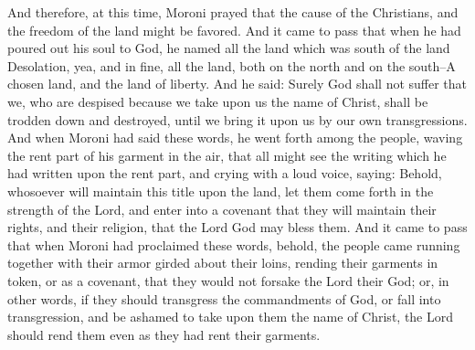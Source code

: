 And therefore, at this time, Moroni prayed that the cause of the Christians, and the freedom of the land might be favored.
\bverse \iffalse And it came to pass that when he had poured out his soul to God, he named all the land which was south of the land Desolation, yea, and in fine, all the land, both on the north and on the south--A chosen land, and the land of liberty. \fi
And it came to pass that when he had poured out his soul to God, he named all the land which was south of the land Desolation, yea, and in fine, all the land, both on the north and on the south--A chosen land, and the land of liberty.
\bverse \iffalse And he said: Surely God shall not suffer that we, who are despised because we take upon us the name of Christ, shall be trodden down and destroyed, until we bring it upon us by our own transgressions. \fi
And he said: Surely God shall not suffer that we, who are despised because we take upon us the name of Christ, shall be trodden down and destroyed, until we bring it upon us by our own transgressions.
\bverse \iffalse And when Moroni had said these words, he went forth among the people, waving the rent part of his garment in the air, that all might see the writing which he had written upon the rent part, and crying with a loud voice, saying: \fi
And when Moroni had said these words, he went forth among the people, waving the rent part of his garment in the air, that all might see the writing which he had written upon the rent part, and crying with a loud voice, saying:
\bverse \iffalse Behold, whosoever will maintain this title upon the land, let them come forth in the strength of the Lord, and enter into a covenant that they will maintain their rights, and their religion, that the Lord God may bless them. \fi
Behold, whosoever will maintain this title upon the land, let them come forth in the strength of the Lord, and enter into a covenant that they will maintain their rights, and their religion, that the Lord God may bless them.
\bverse \iffalse And it came to pass that when Moroni had proclaimed these words, behold, the people came running together with their armor girded about their loins, rending their garments in token, or as a covenant, that they would not forsake the Lord their God; or, in other words, if they should transgress the commandments of God, or fall into transgression, and be ashamed to take upon them the name of Christ, the Lord should rend them even as they had rent their garments. \fi
And it came to pass that when Moroni had proclaimed these words, behold, the people came running together with their armor girded about their loins, rending their garments in token, or as a covenant, that they would not forsake the Lord their God; or, in other words, if they should transgress the commandments of God, or fall into transgression, and be ashamed to take upon them the name of Christ, the Lord should rend them even as they had rent their garments.
